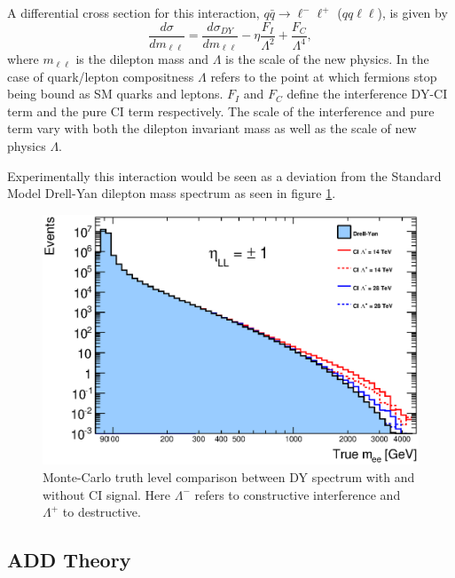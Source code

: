         A differential cross section for this interaction, $q\bar{q} \rightarrow \ell^{-}\ell^{+}$ ($qq\ell\ell$), is given by
        \begin{equation}
            \frac{d\sigma}{dm_{\ell\ell}} = 
                \frac{d\sigma_{DY}}{dm_{\ell\ell}} 
                - \eta\frac{F_{I}}{\Lambda^{2}} 
                + \frac{F_{C}}{\Lambda^{4}},
            \label{eq:DiffCross}
        \end{equation}
        where $m_{\ell\ell}$ is the dilepton mass and $\Lambda$ is the scale of the new physics. In the case of quark/lepton compositness $\Lambda$ refers to the point at which fermions stop being bound as SM quarks and leptons. $F_{I}$ and $F_{C}$ define the interference DY-CI term and the pure CI term respectively. The scale of the interference and pure term vary with both the dilepton invariant mass as well as the scale of new physics $\Lambda$.

        Experimentally this interaction would be seen as a deviation from the Standard Model Drell-Yan dilepton mass spectrum as seen in figure \ref{fig:theoryInvMass}. 

        \begin{figure}[h]
            \begin{center}
            \includegraphics[width=0.9\linewidth]{images/truth_mass_LL.eps}
            \end{center}
            \caption{Monte-Carlo truth level comparison between DY spectrum with and without CI signal. Here $\Lambda^{-}$ refers to constructive interference and $\Lambda^{+}$ to destructive.}
            \label{fig:theoryInvMass}
        \end{figure}

    

    \subsection{ADD Theory}
      \label{sec:ADD_T}

